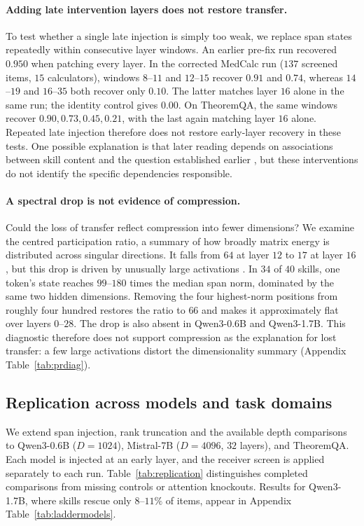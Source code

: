 \documentclass{article}
\begin{document}
\paragraph{Adding late intervention layers does not restore transfer.}
To test whether a single late injection is simply too weak, we replace span
states repeatedly within consecutive layer windows. An earlier pre-fix run
recovered $0.950$ when patching every layer. In the corrected MedCalc run
($137$ screened items, $15$ calculators), windows $8$--$11$ and $12$--$15$
recover $0.91$ and $0.74$, whereas $14$--$19$ and $16$--$35$ both recover
only $0.10$. The latter matches layer $16$ alone in the same run; the identity
control gives $0.00$. On TheoremQA, the same windows recover
$0.90,0.73,0.45,0.21$, with the last again matching layer $16$ alone.
Repeated late injection therefore does not restore early-layer recovery in
these tests. One possible explanation is that later reading depends on
associations between skill content and the question established earlier
\citep{feng2024binding}, but these interventions do not identify the specific
dependencies responsible.

\paragraph{A spectral drop is not evidence of compression.}
Could the loss of transfer reflect compression into fewer dimensions? We
examine the centred participation ratio, a summary of how broadly matrix energy
is distributed across singular directions. It falls from $64$ at layer $12$
to $17$ at layer $16$, but this drop is driven by unusually large activations
\citep{sun2024massive, shi2026melayer}. In $34$ of $40$ skills, one token's
state reaches $99$--$180$ times the median span norm, dominated by the same
two hidden dimensions. Removing the four highest-norm positions from roughly
four hundred restores the ratio to $66$ and makes it approximately flat over
layers $0$--$28$. The drop is also absent in Qwen3-0.6B and Qwen3-1.7B.
This diagnostic therefore does not support compression as the explanation
for lost transfer: a few large activations distort the dimensionality summary
(Appendix Table~\ref{tab:prdiag}).

\subsection{Replication across models and task domains}
\label{sec:ladder}

We extend span injection, rank truncation and the available depth comparisons
to Qwen3-0.6B ($D=1024$), Mistral-7B ($D=4096$, $32$ layers), and TheoremQA.
Each model is injected at an early layer, and the receiver screen is applied
separately to each run. Table~\ref{tab:replication} distinguishes completed
comparisons from missing controls or attention knockouts. Results for
Qwen3-1.7B, where skills rescue only $8$--$11\%$ of items, appear in Appendix
Table~\ref{tab:laddermodels}.
\end{document}
